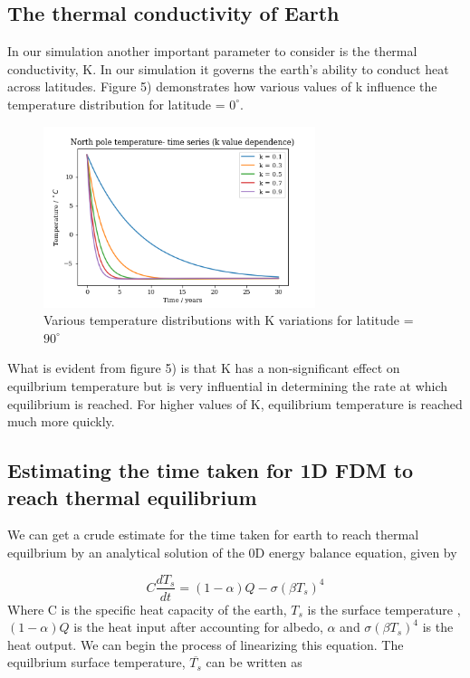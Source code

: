 \documentclass{article}%
\begin{document}
\subsection{The thermal conductivity of Earth}
In our simulation another important parameter to consider is the thermal conductivity, K. 
In our simulation it governs the earth's ability to conduct heat across latitudes.
Figure 5) demonstrates how various values of k influence the temperature distribution for latitude = $0^\circ$.

\begin{figure}[H]%
    \centering
    \includegraphics[width=300px]{north-pole-k-variation.png}
    \caption{Various temperature distributions with K variations for latitude = $90 ^\circ $}
\end{figure}

What is evident from figure 5) is that K has a non-significant effect on equilbrium temperature but is very influential in 
determining the rate at which equilibrium is reached. For higher values of K, equilibrium temperature is reached much more quickly.

\subsection{Estimating the time taken for 1D FDM to reach thermal equilibrium}
We can get a crude estimate for the time taken for earth to reach thermal equilbrium by an analytical solution of the 0D energy balance equation, given by \cite{Rose}

\begin{equation}
  C \frac{dT_{s}}{dt} = (1 - \alpha)Q - \sigma(\beta T_{s})^4 
\end{equation}
Where C is the specific heat capacity of the earth, $T_{s}$ is the surface temperature ,$ (1 - \alpha)Q $ is the heat input after accounting for albedo, $\alpha$ and $\sigma(\beta T_{s})^4$ is the heat output.
We can begin the process of linearizing this equation. 
The equilbrium surface temperature, $ \overline{T_{s}}$ can be written as
\end{document}
